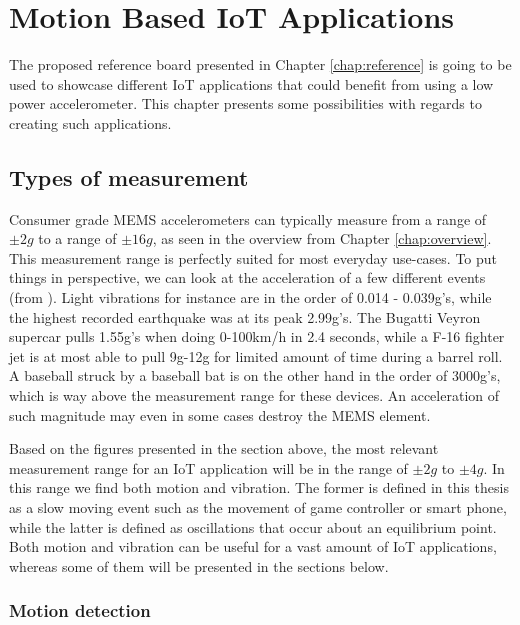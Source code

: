 \chapter{Motion Based IoT Applications}
\label{chap:applications}

The proposed reference board presented in Chapter \ref{chap:reference} is going to be used to showcase different IoT applications that could benefit from using a low power accelerometer. This chapter presents some possibilities with regards to creating such applications. 

\section{Types of measurement}

Consumer grade MEMS accelerometers can typically measure from a range of $\pm2g$ to a range of $\pm16g$, as seen in the overview from Chapter \ref{chap:overview}. This measurement range is perfectly suited for most everyday use-cases. To put things in perspective, we can look at the acceleration of a few different events (from \cite{g-force}). Light vibrations for instance are in the order of 0.014 - 0.039g's, while the highest recorded earthquake was at its peak 2.99g's. The Bugatti Veyron supercar pulls 1.55g's when doing 0-100km/h in 2.4 seconds, while a F-16 fighter jet is at most able to pull 9g-12g for limited amount of time during a barrel roll. A baseball struck by a baseball bat is on the other hand in the order of 3000g's, which is way above the measurement range for these devices. An acceleration of such magnitude may even in some cases destroy the MEMS element. 

Based on the figures presented in the section above, the most relevant measurement range for an IoT application will be in the range of $\pm2g$ to $\pm4g$. In this range we find both motion and vibration. The former is defined in this thesis as a slow moving event such as the movement of game controller or smart phone, while the latter is defined as oscillations that occur about an equilibrium point. Both motion and vibration can be useful for a vast amount of IoT applications, whereas some of them will be presented in the sections below. 

\subsection{Motion detection}

